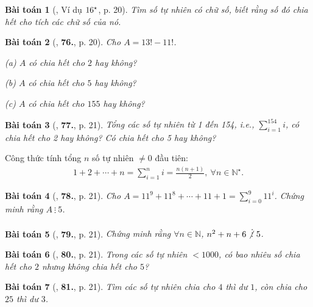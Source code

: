 \documentclass{article}
\numberwithin{equation}{section}
\newtheorem{baitoan}{Bài toán}[section]
\begin{document}
\begin{baitoan}[\cite{Binh_Toan_6_tap_1}, Ví dụ $\rm 16^\star$, p. 20]
	Tìm số tự nhiên có chữ số, biết rằng số đó chia hết cho tích các chữ số của nó.
\end{baitoan}

\begin{baitoan}[\cite{Binh_Toan_6_tap_1}, \textbf{76.}, p. 20]
	Cho $A = 13! - 11!$.
	\begin{enumerate*}
		\item[(a)] $A$ có chia hết cho $2$ hay không?
		\item[(b)] $A$ có chia hết cho $5$ hay không?
		\item[(c)] $A$ có chia hết cho $155$ hay không?
	\end{enumerate*}
\end{baitoan}

\begin{baitoan}[\cite{Binh_Toan_6_tap_1}, \textbf{77.}, p. 21]
	Tổng các số tự nhiên từ 1 đến 154, i.e., $\sum_{i=1}^{154} i$, có chia hết cho 2 hay không? Có chia hết cho 5 hay không?
\end{baitoan}
Công thức tính tổng $n$ số tự nhiên $\ne 0$ đầu tiên:
\begin{align*}
	\boxed{1 + 2 + \cdots + n = \sum_{i=1}^n i = \frac{n(n + 1)}{2},\ \forall n\in\mathbb{N}^\star.}
\end{align*}

\begin{baitoan}[\cite{Binh_Toan_6_tap_1}, \textbf{78.}, p. 21]
	Cho $A = 11^9 + 11^8 + \cdots + 11 + 1 = \sum_{i=0}^9 11^i$. Chứng minh rằng $A\ \vdots\ 5$.
\end{baitoan}

\begin{baitoan}[\cite{Binh_Toan_6_tap_1}, \textbf{79.}, p. 21]
	Chứng minh rằng $\forall n\in\mathbb{N}$, $n^2 + n + 6\not\vdots\ 5$.
\end{baitoan}

\begin{baitoan}[\cite{Binh_Toan_6_tap_1}, \textbf{80.}, p. 21]
	Trong các số tự nhiên $< 1000$, có bao nhiêu số chia hết cho $2$ nhưng không chia hết cho $5$?
\end{baitoan}

\begin{baitoan}[\cite{Binh_Toan_6_tap_1}, \textbf{81.}, p. 21]
	Tìm các số tự nhiên chia cho $4$ thì dư $1$, còn chia cho $25$ thì dư $3$.
\end{baitoan}
\end{document}
